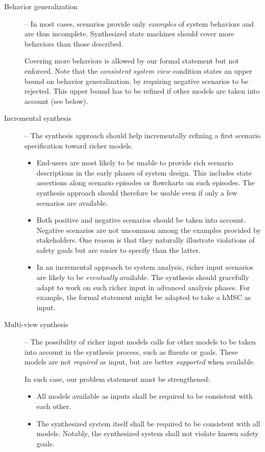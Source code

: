 \begin{description}
\item[Behavior generalization] -- In most cases, scenarios provide only \emph{examples} of system behaviors and are thus incomplete. Synthesized state machines should cover more behaviors than those described. 

Covering more behaviors is allowed by our formal statement but not enforced. Note that the \emph{consistent system view} condition states an upper bound on behavior generalization, by requiring negative scenarios to be rejected. This upper bound has to be refined if other models are taken into account (see below).

\item[Incremental synthesis] -- The synthesis approach should help incrementally refining a first scenario specification toward richer models.
\begin{itemize}

\item End-users are most likely to be unable to provide rich scenario descriptions in the early phases of system design. This includes state assertions along scenario episodes or flowcharts on such episodes. The synthesis approach should therefore be usable even if only a few scenarios are available.

\item Both positive and negative scenarios should be taken into account. Negative scenarios are not uncommon among the examples provided by stakeholders. One reason is that they naturally illustrate violations of safety goals but are easier to specify than the latter.

\item In an incremental approach to system analysis, richer input scenarios are likely to be \emph{eventually} available. The synthesis should gracefully adapt to work on such richer input in advanced analysis phases. For example, the formal statement might be adapted to take a hMSC as input. 

\end{itemize}

\item[Multi-view synthesis] -- The possibility of richer input models calls for other models to be taken into account in the synthesis process, such as fluents or goals. These models are not \emph{required} as input, but are better \emph{supported} when available. 

\noindent In such case, our problem statement must be strengthened: 
\begin{itemize}
\item All models available as inputs shall be required to be consistent with each other. 
\item The synthesized system itself shall be required to be consistent with all models. Notably, the synthesized system shall not violate known safety goals.
\end{itemize}

\end{description}

